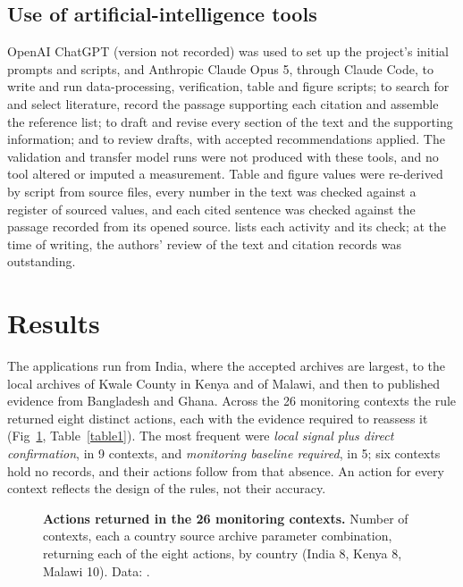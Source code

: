 \documentclass[10pt,letterpaper]{article}
\begin{document}
\subsection*{Use of artificial-intelligence tools}

OpenAI ChatGPT (version not recorded) was used to set up the project's initial prompts and scripts, and Anthropic Claude Opus 5, through Claude Code, to write and run data-processing, verification, table and figure scripts; to search for and select literature, record the passage supporting each citation and assemble the reference list; to draft and revise every section of the text and the supporting information; and to review drafts, with accepted recommendations applied. The validation and transfer model runs were not produced with these tools, and no tool altered or imputed a measurement. Table and figure values were re-derived by script from source files, every number in the text was checked against a register of sourced values, and each cited sentence was checked against the passage recorded from its opened source.  lists each activity and its check; at the time of writing, the authors' review of the text and citation records was outstanding.

\FloatBarrier

\section*{Results}

The applications run from India, where the accepted archives are largest, to the local archives of Kwale County in Kenya and of Malawi, and then to published evidence from Bangladesh and Ghana. Across the 26 monitoring contexts the rule returned eight distinct actions, each with the evidence required to reassess it (Fig~\ref{fig:action-distribution}, Table~\ref{table1}). The most frequent were \textit{local signal plus direct confirmation}, in 9 contexts, and \textit{monitoring baseline required}, in 5; six contexts hold no records, and their actions follow from that absence. An action for every context reflects the design of the rules, not their accuracy.\label{callout:fig:action-distribution}\label{callout:table1}

\begin{figure}[!ht]
\caption{\textbf{Actions returned in the 26 monitoring contexts.} Number of contexts, each a country \texttimes{} source archive \texttimes{} parameter combination, returning each of the eight actions, by country (India 8, Kenya 8, Malawi 10). Data: .}
\label{fig:action-distribution}
\end{figure}
\end{document}
